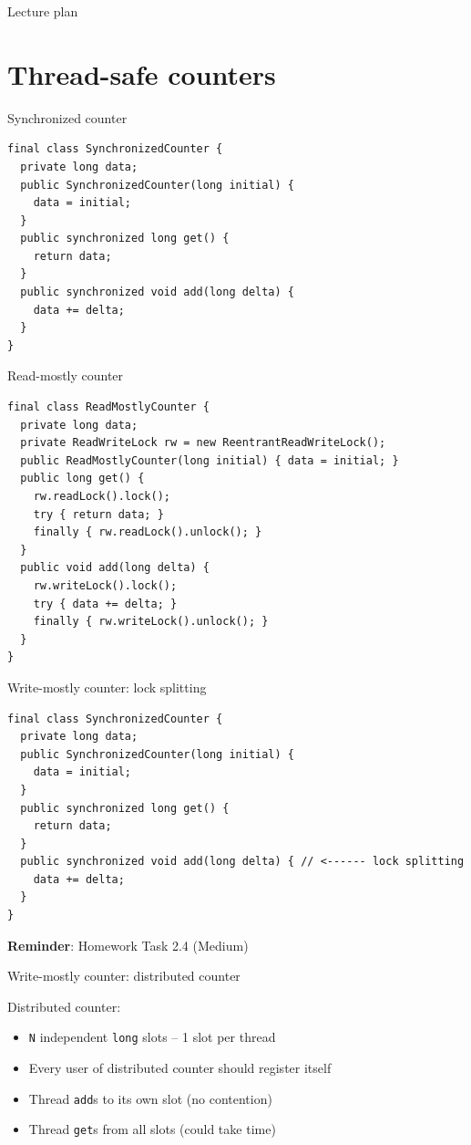 \begin{frame}{Lecture plan}
\tableofcontents
\end{frame}

\section{Thread-safe counters}
\showTOCSub

\begin{frame}[t,fragile]{Synchronized counter}

\begin{verbatim}
final class SynchronizedCounter {
  private long data;
  public SynchronizedCounter(long initial) { 
    data = initial; 
  }
  public synchronized long get() { 
    return data; 
  }
  public synchronized void add(long delta) { 
    data += delta; 
  }
}
\end{verbatim}
\end{frame}

\begin{frame}[fragile]{Read-mostly counter}

\begin{verbatim}
final class ReadMostlyCounter {
  private long data;
  private ReadWriteLock rw = new ReentrantReadWriteLock();
  public ReadMostlyCounter(long initial) { data = initial; }
  public long get() { 
    rw.readLock().lock();
    try { return data; } 
    finally { rw.readLock().unlock(); }
  }
  public void add(long delta) { 
    rw.writeLock().lock();
    try { data += delta; } 
    finally { rw.writeLock().unlock(); }
  }
}
\end{verbatim}
\end{frame}

\begin{frame}[fragile]{Write-mostly counter: lock splitting}

\begin{verbatim}
final class SynchronizedCounter {
  private long data;
  public SynchronizedCounter(long initial) { 
    data = initial; 
  }
  public synchronized long get() { 
    return data; 
  }
  public synchronized void add(long delta) { // <------ lock splitting
    data += delta; 
  }
}
\end{verbatim}

\textbf{Reminder}: Homework Task 2.4 (Medium)
\end{frame}

\begin{frame}[t,fragile]{Write-mostly counter: distributed counter}

Distributed counter:
\begin{itemize}
    \item \texttt{N} independent \texttt{long} slots -- 1 slot per thread
    \item Every user of distributed counter should register itself
    \item Thread \texttt{add}s to its own slot (no contention)
    \item Thread \texttt{get}s from all slots (could take time)
\end{itemize}
\end{frame}

